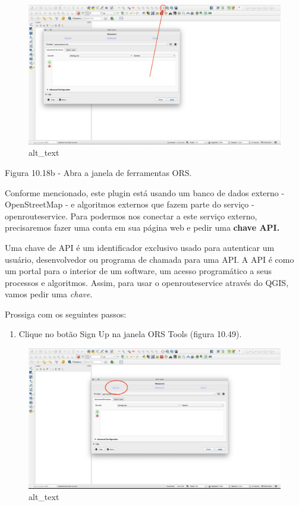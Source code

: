 \documentclass[
]{book}
\providecommand{\tightlist}{%
  \setlength{\itemsep}{0pt}\setlength{\parskip}{0pt}}
\begin{document}
\begin{figure}
\centering
\includegraphics{media/modulo10/fig1018_b.png}
\caption{alt\_text}
\end{figure}

Figura 10.18b - Abra a janela de ferramentas ORS.

Conforme mencionado, este plugin está usando um banco de dados externo - OpenStreetMap - e algoritmos externos que fazem parte do serviço - openrouteservice. Para podermos nos conectar a este serviço externo, precisaremos fazer uma conta em sua página web e pedir uma \textbf{chave API.}

Uma chave de API é um identificador exclusivo usado para autenticar um usuário, desenvolvedor ou programa de chamada para uma API. A API é como um portal para o interior de um software, um acesso programático a seus processos e algoritmos. Assim, para usar o openrouteservice através do QGIS, vamos pedir uma \emph{chave}.

Prossiga com os seguintes passos:

\begin{enumerate}
\def\labelenumi{\arabic{enumi}.}
\tightlist
\item
  Clique no botão Sign Up na janela ORS Tools (figura 10.49).
\end{enumerate}

\begin{figure}
\centering
\includegraphics{media/modulo10/fig1018_c.png}
\caption{alt\_text}
\end{figure}
\end{document}
